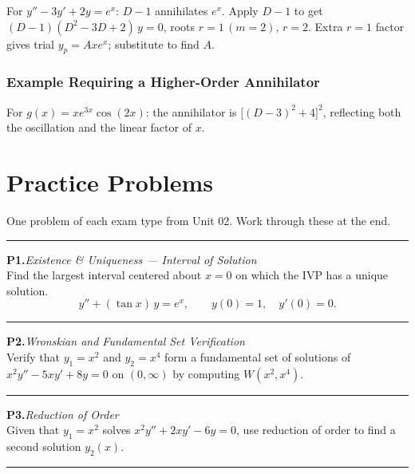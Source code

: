 \documentclass[10pt]{article}
\newcommand{\m}[1]{$#1$}
\newcommand{\annotspace}[1][3.5cm]{\vspace{#1}}
\begin{document}
    For \m{y'' - 3y' + 2y = e^x}: \m{D-1} annihilates \m{e^x}. Apply \m{D-1} to get
    \m{(D-1)(D^2 - 3D + 2)\,y = 0}, roots \m{r = 1\,(m=2),\, r = 2}. Extra \m{r=1} factor gives
    trial \m{y_p = Axe^x}; substitute to find \m{A}.

    \annotspace[5cm]

    \subsubsection{Example Requiring a Higher-Order Annihilator}

    For \m{g(x) = xe^{3x}\cos(2x)}: the annihilator is \m{\bigl[(D-3)^2 + 4\bigr]^2}, reflecting
    both the oscillation and the linear factor of \m{x}.

    \annotspace[5cm]

\newpage
\section*{Practice Problems}

One problem of each exam type from Unit 02. Work through these at the end.

\bigskip
\hrule
\bigskip

\noindent\textbf{P1.}\quad\textit{Existence \& Uniqueness --- Interval of Solution}\\
Find the largest interval centered about \m{x = 0} on which the IVP has a unique solution.
\[
    y'' + (\tan x)\,y = e^x, \qquad y(0) = 1,\quad y'(0) = 0.
\]
\annotspace[5cm]

\hrule\medskip

\noindent\textbf{P2.}\quad\textit{Wronskian and Fundamental Set Verification}\\
Verify that \m{y_1 = x^2} and \m{y_2 = x^4} form a fundamental set of solutions of
\m{x^2 y'' - 5xy' + 8y = 0} on \m{(0,\infty)} by computing \m{W(x^2, x^4)}.
\annotspace[5.5cm]

\hrule\medskip

\noindent\textbf{P3.}\quad\textit{Reduction of Order}\\
Given that \m{y_1 = x^2} solves \m{x^2 y'' + 2xy' - 6y = 0}, use reduction of order to find a
second solution \m{y_2(x)}.
\annotspace[6cm]

\hrule\medskip
\end{document}

